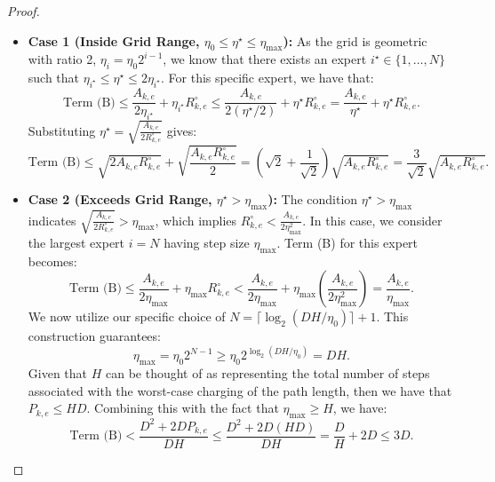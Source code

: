 \documentclass[journal,onecolumn]{IEEEtran}
\theoremstyle{plain}
\theoremstyle{definition}
\theoremstyle{remark}
\begin{document}
{\begin{proof}
\begin{itemize}
    \item \textbf{Case 1 (Inside Grid Range, $\eta_0 \le \eta^\star \le \eta_{\max}$):}
     As the grid is geometric with ratio 2, $\eta_{i}=\eta_{0}2^{i-1}$, we know that there exists an expert $i^\star \in \{1,\ldots,N\}$ such that $\eta_{i^\star}\le\eta^{\star}\le2\eta_{i^\star}$. For this specific expert, we have that:
    \begin{equation*}
    \text{Term (B)} \le \frac{A_{k,e}}{2\eta_{i^\star}} + \eta_{i^\star} R_{k,e}^{\circ}
    \le \frac{A_{k,e}}{2(\eta^\star/2)} + \eta^\star R_{k,e}^{\circ}
    = \frac{A_{k,e}}{\eta^\star} + \eta^\star R_{k,e}^{\circ}.
    \end{equation*}
    Substituting $\eta^\star = \sqrt{\frac{A_{k,e}}{2R_{k,e}^{\circ}}}$ gives:
    \begin{equation*}
    \text{Term (B)} \le \sqrt{2 A_{k,e} R_{k,e}^{\circ}} + \sqrt{\frac{A_{k,e} R_{k,e}^{\circ}}{2}} 
    = \left(\sqrt{2} + \frac{1}{\sqrt{2}}\right)\sqrt{A_{k,e} R_{k,e}^{\circ}} 
    = \frac{3}{\sqrt{2}}\sqrt{A_{k,e} R_{k,e}^{\circ}}.
    \end{equation*}

    \item \textbf{Case 2 (Exceeds Grid Range, $\eta^\star > \eta_{\max}$):}
    The condition $\eta^{\star}>\eta_{\max}$ indicates $\sqrt{\frac{A_{k,e}}{2R_{k,e}^{\circ}}} > \eta_{\max}$, which implies $R_{k,e}^{\circ} < \frac{A_{k,e}}{2\eta_{\max}^2}$.
    In this case, we consider the largest expert $i=N$ having step size $\eta_{\max}$. Term (B) for this expert becomes:
    \begin{equation*}
    \text{Term (B)} \le \frac{A_{k,e}}{2\eta_{\max}} + \eta_{\max} R_{k,e}^{\circ}
    < \frac{A_{k,e}}{2\eta_{\max}} + \eta_{\max} \left( \frac{A_{k,e}}{2\eta_{\max}^2} \right)
    = \frac{A_{k,e}}{\eta_{\max}}.
    \end{equation*}
    We now utilize our specific choice of $N = \lceil \log_2(DH/\eta_0) \rceil + 1$. This construction guarantees:
    \begin{equation*}
    \eta_{\max} = \eta_0 2^{N-1} \ge \eta_0 2^{\log_2(DH/\eta_0)} = DH.
    \end{equation*}
    Given that $H$ can be thought of as representing the total number of steps associated with the worst-case charging of the path length, then we have that $P_{k,e}\leq HD$. Combining this with the fact that $\eta_{\max}\ge H$, we have:
    \begin{equation*}
    \text{Term (B)} < \frac{D^2 + 2D P_{k,e}}{DH} 
    \le \frac{D^2 + 2D(HD)}{DH} 
    = \frac{D}{H} + 2D 
    \le 3D.
    \end{equation*}
\end{itemize}


\end{proof}}
\end{document}
